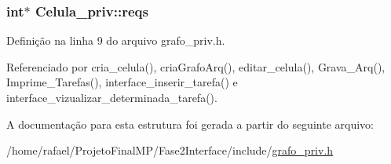 \hypertarget{structCelula__priv_ad54839cd4d96e78a58c226ab2e8d0579}{}
\subsubsection[{reqs}]{\setlength{\rightskip}{0pt plus 5cm}int$\ast$ Celula\+\_\+priv\+::reqs}\label{structCelula__priv_ad54839cd4d96e78a58c226ab2e8d0579}


Definição na linha 9 do arquivo grafo\+\_\+priv.\+h.



Referenciado por cria\+\_\+celula(), cria\+Grafo\+Arq(), editar\+\_\+celula(), Grava\+\_\+\+Arq(), Imprime\+\_\+\+Tarefas(), interface\+\_\+inserir\+\_\+tarefa() e interface\+\_\+vizualizar\+\_\+determinada\+\_\+tarefa().



A documentação para esta estrutura foi gerada a partir do seguinte arquivo\+:\begin{DoxyCompactItemize}
\item 
/home/rafael/\+Projeto\+Final\+M\+P/\+Fase2\+Interface/include/\hyperlink{grafo__priv_8h}{grafo\+\_\+priv.\+h}\end{DoxyCompactItemize}
